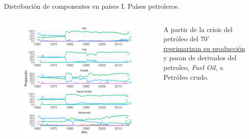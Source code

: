 \documentclass[compress]{beamer}
\begin{document}
\begin{frame}

\small

Distribución de componentes en países I. Países petroleros.

\begin{columns}[c] 
	
	\begin{figure}
		\includegraphics[width=\linewidth]{graficoLDA_k30_IRN_IRQ_KWT_SAU_VEN}
	\end{figure}
	
	
	A partir de la crisis del petróleo del 70' \underline{reprimarizan su producción} y pasan de derivados del petroleo, \textit{Fuel Oil}, a Petróleo crudo.
	
\end{columns} 

\end{frame}
\end{document}

